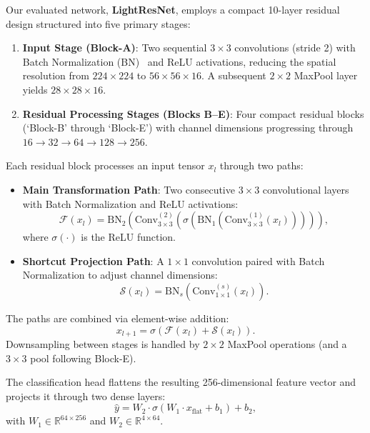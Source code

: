 \documentclass[conference]{IEEEtran}
\begin{document}
Our evaluated network, \textbf{LightResNet}, employs a compact 10-layer residual design structured into five primary stages:
\begin{enumerate}
    \item \textbf{Input Stage (Block-A)}: Two sequential $3 \times 3$ convolutions (stride 2) with Batch Normalization (BN)~\cite{ioffe2015batch} and ReLU activations, reducing the spatial resolution from $224 \times 224$ to $56 \times 56 \times 16$. A subsequent $2 \times 2$ MaxPool layer yields $28 \times 28 \times 16$.
    \item \textbf{Residual Processing Stages (Blocks B--E)}: Four compact residual blocks (`Block-B' through `Block-E') with channel dimensions progressing through $16 \to 32 \to 64 \to 128 \to 256$.
\end{enumerate}

Each residual block processes an input tensor $x_l$ through two paths:
\begin{itemize}
    \item \textbf{Main Transformation Path}: Two consecutive $3 \times 3$ convolutional layers with Batch Normalization and ReLU activations:
    \begin{equation}
    \mathcal{F}(x_l) = \text{BN}_2\left(\text{Conv}_{3\times3}^{(2)}\left(\sigma\left(\text{BN}_1\left(\text{Conv}_{3\times3}^{(1)}(x_l)\right)\right)\right)\right),
    \end{equation}
    where $\sigma(\cdot)$ is the ReLU function.
    \item \textbf{Shortcut Projection Path}: A $1 \times 1$ convolution paired with Batch Normalization to adjust channel dimensions:
    \begin{equation}
    \mathcal{S}(x_l) = \text{BN}_s\left(\text{Conv}_{1\times1}^{(s)}(x_l)\right).
    \end{equation}
\end{itemize}
The paths are combined via element-wise addition:
\begin{equation}
x_{l+1} = \sigma\left(\mathcal{F}(x_l) + \mathcal{S}(x_l)\right).
\end{equation}
Downsampling between stages is handled by $2 \times 2$ MaxPool operations (and a $3 \times 3$ pool following Block-E).

The classification head flattens the resulting 256-dimensional feature vector and projects it through two dense layers:
\begin{equation}
\hat{y} = W_2 \cdot \sigma\left(W_1 \cdot x_{\text{flat}} + b_1\right) + b_2,
\end{equation}
with $W_1 \in \mathbb{R}^{64 \times 256}$ and $W_2 \in \mathbb{R}^{4 \times 64}$.
\end{document}
